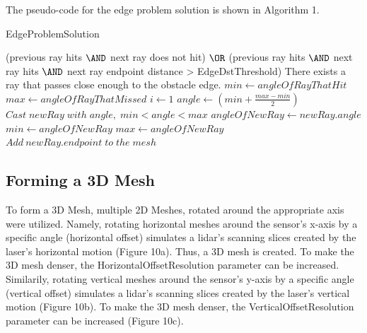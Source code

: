 \documentclass{article}
\begin{document}
The pseudo-code for the edge problem solution is shown in Algorithm 1.

\begin{algorithm}
\caption{EdgeProblemSolution}
\begin{algorithmic} 
\REQUIRE (previous ray hits $ \AND $  next ray does not hit) $ \OR $ (previous ray hits $ \AND $ next ray hits $ \AND $ next ray endpoint distance > EdgeDstThreshold)
\ENSURE There exists a ray that passes close enough to the obstacle edge.
\STATE $min \leftarrow angleOfRayThatHit$
\STATE $max \leftarrow angleOfRayThatMissed$
\STATE $i \leftarrow 1$
\STATE $ angle \leftarrow (min + \frac{max-min}{2}) $
\STATE $ Cast\; newRay\; with\; angle,\; min < angle < max$
\STATE $angleOfNewRay \leftarrow newRay.angle$
\STATE $min \leftarrow angleOfNewRay$
\ELSE
\STATE $max \leftarrow angleOfNewRay$
\ENDIF
\ENDWHILE
\STATE $ Add\: newRay.endpoint\; to\; the\; mesh $
\end{algorithmic}
\end{algorithm}

\subsection{Forming a 3D Mesh}

To form a 3D Mesh, multiple 2D Meshes, rotated around the appropriate axis were utilized. Namely, rotating horizontal meshes around the sensor's x-axis by a specific angle (horizontal offset) simulates a lidar's scanning slices created by the laser's horizontal motion (Figure 10a). Thus, a 3D mesh is created. To make the 3D mesh denser, the HorizontalOffsetResolution parameter can be increased. Similarily, rotating vertical meshes around the sensor's y-axis by a specific angle (vertical offset)  simulates a lidar's scanning slices created by the laser's vertical motion (Figure 10b).  To make the 3D mesh denser, the VerticalOffsetResolution parameter can be increased (Figure 10c).
\end{document}
